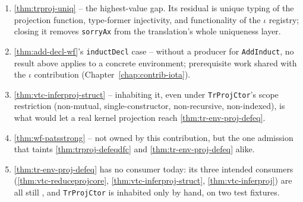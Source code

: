 \begin{enumerate}
\item \ref{thm:trproj-uniq} -- the highest-value gap. Its residual is unique typing of the
projection function, type-former injectivity, and functionality of the $\iota$ registry; closing
it removes \texttt{sorryAx} from the translation's whole uniqueness layer.
\item \ref{thm:add-decl-wf}'s \texttt{inductDecl} case -- without a producer for
\texttt{AddInduct}, no result above applies to a concrete environment; prerequisite work shared
with the $\iota$ contribution (Chapter~\ref{chap:contrib-iota}).
\item \ref{thm:vtc-inferproj-struct} -- inhabiting it, even under \texttt{TrProjCtor}'s scope
restriction (non-mutual, single-constructor, non-recursive, non-indexed), is what would let a real
kernel projection reach \ref{thm:tr-env-proj-defeq}.
\item \ref{thm:wf-patsstrong} -- not owned by this contribution, but the one admission that taints
\ref{thm:trproj-defeqdfc} and \ref{thm:tr-env-proj-defeq} alike.
\item {} \ref{thm:tr-env-proj-defeq} has no consumer today: its three intended
consumers (\ref{thm:vtc-reduceprojcore}, \ref{thm:vtc-inferproj-struct}, \ref{thm:vtc-inferproj})
are all still \stSorry{}, and \texttt{TrProjCtor} is inhabited only by hand, on two test fixtures.
\end{enumerate}
